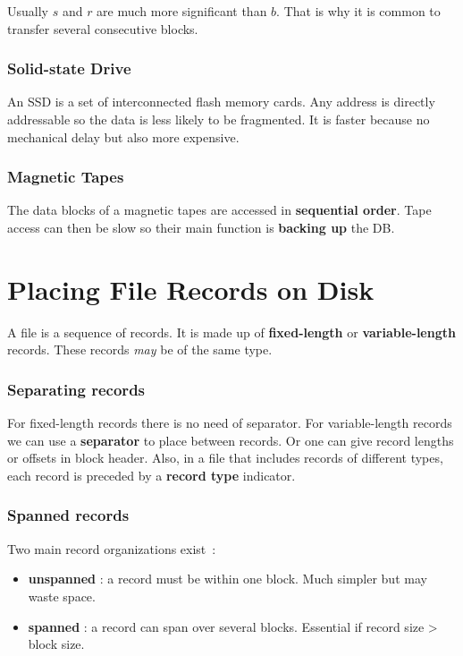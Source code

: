 Usually $s$ and $r$ are much more significant than $b$. That is why it is common to transfer several consecutive blocks. \\

\subsubsection*{Solid-state Drive}

An SSD is a set of interconnected flash memory cards. Any address is directly addressable so the data is less likely to be fragmented. It is faster because no mechanical delay but also more expensive.

\subsubsection*{Magnetic Tapes}
The data blocks of a magnetic tapes are accessed in \textbf{sequential order}. Tape access can then be slow so their main function is \textbf{backing up} the DB.



\section{Placing File Records on Disk}

A file is a sequence of records. It is made up of \textbf{fixed-length} or \textbf{variable-length} records. These records \textit{may} be of the same type.

\subsubsection*{Separating records}

For fixed-length records there is no need of separator. For variable-length records we can use a \textbf{separator} to place between records. Or one can give record lengths or offsets in block header. Also, in a file that includes records of different types, each record is preceded by a \textbf{record type} indicator.

\subsubsection*{Spanned records}

\begin{samepage}

Two main record organizations exist~:
\begin{itemize}
    \item \textbf{unspanned} : a record must be within one block. Much simpler but may waste space.
    \item \textbf{spanned} : a record can span over several blocks. Essential if record size > block size.
\end{itemize}
\end{samepage}

